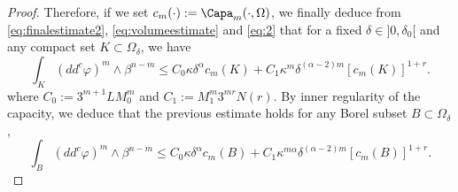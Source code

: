 \begin{proof}
Therefore, if we set $c_m (\cdot):= \Capa_m (\cdot,\Omega)$, we finally deduce from \eqref{eq:finalestimate2}, \eqref{eq:volumeestimate} and \eqref{eq:2} that for a fixed $\delta\in{}]0,\delta_0[$ and any compact set $K \subset \Omega_\delta$, we have
\begin{equation}
\int_K (dd^c\varphi)^m\wedge\beta^{n-m} \leq C_0\kappa \delta^{\alpha} c_m (K) + C_1 \kappa^m \delta^{(\alpha -2) m } [c_m(K)]^{1+ r}.
\end{equation}
where $C_0:= 3^{m + 1} L M_0^m$ and $C_1:= M_1^{m} 3^{m r} N (r)$. By inner regularity of the capacity, we deduce that the previous estimate holds for any Borel subset $B \subset \Omega_\delta$, \ie \begin{equation} \label{eq:estimate1}
\int_B (dd^c\varphi)^m\wedge\beta^{n-m} \leq C_0 \kappa \delta^{\alpha} c_m (B) + C_1 \kappa^{m \alpha } \delta^{(\alpha -2) m} [c_m(B)]^{1+r}.
\end{equation}


\end{proof}
